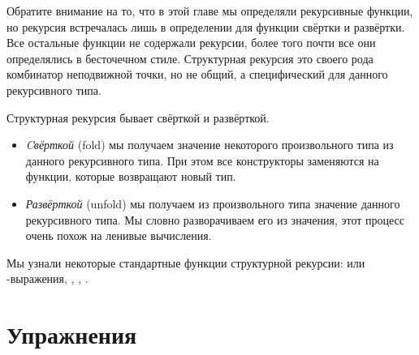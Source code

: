 Обратите внимание на то, что в этой главе мы определяли
рекурсивные функции, но рекурсия встречалась лишь 
в определении для функции свёртки и развёртки. 
Все остальные функции не содержали рекурсии, более того
почти все они определялись в бесточечном стиле.
Структурная рекурсия это своего рода комбинатор 
неподвижной точки, но не общий, а специфический для
данного рекурсивного типа.

Структурная рекурсия бывает свёрткой и развёрткой. 

\begin{itemize}

\item \emph{Cвёрткой} (fold) мы получаем значение некоторого 
произвольного типа из данного рекурсивного типа. 
При этом все конструкторы заменяются на функции, 
которые возвращают новый тип. 

\item \emph{Развёрткой} (unfold) мы получаем из произвольного типа
значение данного рекурсивного типа. Мы словно разворачиваем 
его из значения, этот процесс очень похож на ленивые
вычисления. 

\end{itemize}

Мы узнали некоторые стандартные функции структурной
рекурсии:  или -выражения, ,
, .

\section{Упражнения}


